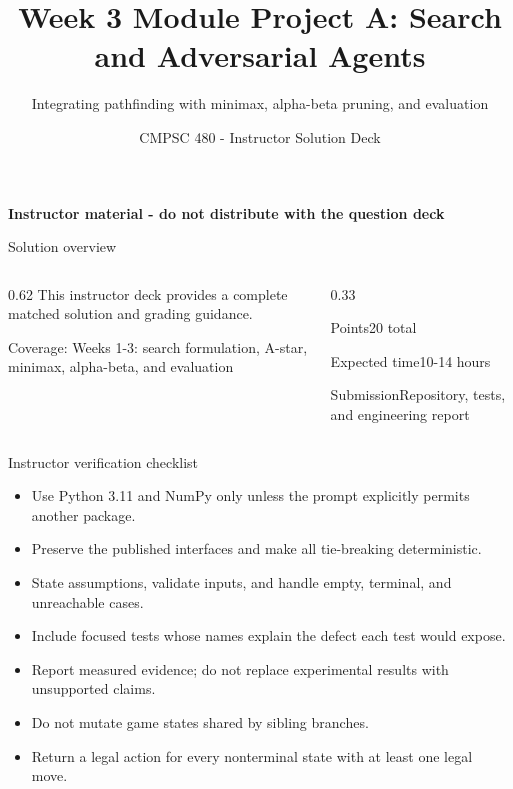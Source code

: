 \documentclass[aspectratio=169,11pt]{beamer}
\title[Module Project A Solutions]{Week 3 Module Project A: Search and Adversarial Agents}
\subtitle{Integrating pathfinding with minimax, alpha-beta pruning, and evaluation}
\author{CMPSC 480 - Instructor Solution Deck}
\date{}
\begin{document}
\begin{frame}
  \titlepage
\vspace{-0.35cm}
\begin{center}
\color{coursered}\bfseries Instructor material - do not distribute with the question deck
\end{center}
\end{frame}

\begin{frame}{Solution overview}
\begin{columns}[T,onlytextwidth]
\begin{column}{0.62\textwidth}
\Large This instructor deck provides a complete matched solution and grading guidance.

\vspace{0.35cm}
\normalsize
Coverage: Weeks 1-3: search formulation, A-star, minimax, alpha-beta, and evaluation
\end{column}
\begin{column}{0.33\textwidth}
\begin{block}{Points}20 total\end{block}
\begin{block}{Expected time}10-14 hours\end{block}
\begin{block}{Submission}Repository, tests, and engineering report\end{block}
\end{column}
\end{columns}
\end{frame}

\begin{frame}{Instructor verification checklist}
\small
\begin{itemize}
  \item Use Python 3.11 and NumPy only unless the prompt explicitly permits another package.
  \item Preserve the published interfaces and make all tie-breaking deterministic.
  \item State assumptions, validate inputs, and handle empty, terminal, and unreachable cases.
  \item Include focused tests whose names explain the defect each test would expose.
  \item Report measured evidence; do not replace experimental results with unsupported claims.
  \item Do not mutate game states shared by sibling branches.
  \item Return a legal action for every nonterminal state with at least one legal move.
\end{itemize}
\end{frame}
\end{document}
